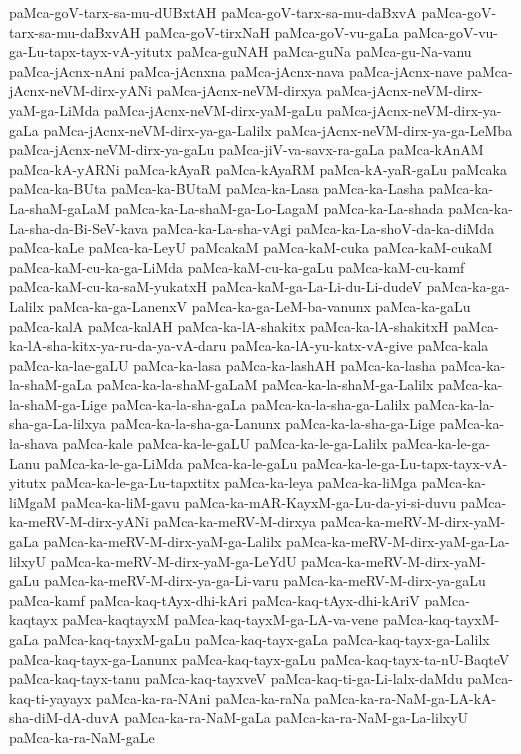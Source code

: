 {paMca-goV-tarx-sa-mu-dUBxtAH
paMca-goV-tarx-sa-mu-daBxvA
paMca-goV-tarx-sa-mu-daBxvAH
paMca-goV-tirxNaH
paMca-goV-vu-gaLa
paMca-goV-vu-ga-Lu-tapx-tayx-vA-yitutx
paMca-guNAH
paMca-guNa
paMca-gu-Na-vanu
paMca-jAcnx-nAni
paMca-jAcnxna
paMca-jAcnx-nava
paMca-jAcnx-nave
paMca-jAcnx-neVM-dirx-yANi
paMca-jAcnx-neVM-dirxya
paMca-jAcnx-neVM-dirx-yaM-ga-LiMda
paMca-jAcnx-neVM-dirx-yaM-gaLu
paMca-jAcnx-neVM-dirx-ya-gaLa
paMca-jAcnx-neVM-dirx-ya-ga-Lalilx
paMca-jAcnx-neVM-dirx-ya-ga-LeMba
paMca-jAcnx-neVM-dirx-ya-gaLu
paMca-jiV-va-savx-ra-gaLa
paMca-kAnAM
paMca-kA-yARNi
paMca-kAyaR
paMca-kAyaRM
paMca-kA-yaR-gaLu
paMcaka
paMca-ka-BUta
paMca-ka-BUtaM
paMca-ka-Lasa
paMca-ka-Lasha
paMca-ka-La-shaM-gaLaM
paMca-ka-La-shaM-ga-Lo-LagaM
paMca-ka-La-shada
paMca-ka-La-sha-da-Bi-SeV-kava
paMca-ka-La-sha-vAgi
paMca-ka-La-shoV-da-ka-diMda
paMca-kaLe
paMca-ka-LeyU
paMcakaM
paMca-kaM-cuka
paMca-kaM-cukaM
paMca-kaM-cu-ka-ga-LiMda
paMca-kaM-cu-ka-gaLu
paMca-kaM-cu-kamf
paMca-kaM-cu-ka-saM-yukatxH
paMca-kaM-ga-La-Li-du-Li-dudeV
paMca-ka-ga-Lalilx
paMca-ka-ga-LanenxV
paMca-ka-ga-LeM-ba-vanunx
paMca-ka-gaLu
paMca-kalA
paMca-kalAH
paMca-ka-lA-shakitx
paMca-ka-lA-shakitxH
paMca-ka-lA-sha-kitx-ya-ru-da-ya-vA-daru
paMca-ka-lA-yu-katx-vA-give
paMca-kala
paMca-ka-lae-gaLU
paMca-ka-lasa
paMca-ka-lashAH
paMca-ka-lasha
paMca-ka-la-shaM-gaLa
paMca-ka-la-shaM-gaLaM
paMca-ka-la-shaM-ga-Lalilx
paMca-ka-la-shaM-ga-Lige
paMca-ka-la-sha-gaLa
paMca-ka-la-sha-ga-Lalilx
paMca-ka-la-sha-ga-La-lilxya
paMca-ka-la-sha-ga-Lanunx
paMca-ka-la-sha-ga-Lige
paMca-ka-la-shava
paMca-kale
paMca-ka-le-gaLU
paMca-ka-le-ga-Lalilx
paMca-ka-le-ga-Lanu
paMca-ka-le-ga-LiMda
paMca-ka-le-gaLu
paMca-ka-le-ga-Lu-tapx-tayx-vA-yitutx
paMca-ka-le-ga-Lu-tapxtitx
paMca-ka-leya
paMca-ka-liMga
paMca-ka-liMgaM
paMca-ka-liM-gavu
paMca-ka-mAR-KayxM-ga-Lu-da-yi-si-duvu
paMca-ka-meRV-M-dirx-yANi
paMca-ka-meRV-M-dirxya
paMca-ka-meRV-M-dirx-yaM-gaLa
paMca-ka-meRV-M-dirx-yaM-ga-Lalilx
paMca-ka-meRV-M-dirx-yaM-ga-La-lilxyU
paMca-ka-meRV-M-dirx-yaM-ga-LeYdU
paMca-ka-meRV-M-dirx-yaM-gaLu
paMca-ka-meRV-M-dirx-ya-ga-Li-varu
paMca-ka-meRV-M-dirx-ya-gaLu
paMca-kamf
paMca-kaq-tAyx-dhi-kAri
paMca-kaq-tAyx-dhi-kAriV
paMca-kaqtayx
paMca-kaqtayxM
paMca-kaq-tayxM-ga-LA-va-vene
paMca-kaq-tayxM-gaLa
paMca-kaq-tayxM-gaLu
paMca-kaq-tayx-gaLa
paMca-kaq-tayx-ga-Lalilx
paMca-kaq-tayx-ga-Lanunx
paMca-kaq-tayx-gaLu
paMca-kaq-tayx-ta-nU-BaqteV
paMca-kaq-tayx-tanu
paMca-kaq-tayxveV
paMca-kaq-ti-ga-Li-lalx-daMdu
paMca-kaq-ti-yayayx
paMca-ka-ra-NAni
paMca-ka-raNa
paMca-ka-ra-NaM-ga-LA-kA-sha-diM-dA-duvA
paMca-ka-ra-NaM-gaLa
paMca-ka-ra-NaM-ga-La-lilxyU
paMca-ka-ra-NaM-gaLe
}
